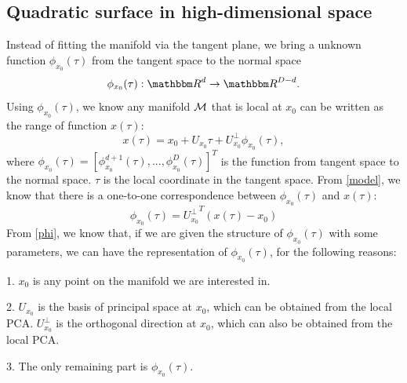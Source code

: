\documentclass{article}
\theoremstyle{remark}
\begin{document}
\subsection{Quadratic surface in high-dimensional space }

 Instead of fitting the manifold via the tangent plane, we bring a unknown function $\phi_{x_0}(\tau)$ from the tangent space to the normal space
 \[
 \phi_{x_0}(\tau): {\mathbbm R}^d \rightarrow {\mathbbm R}^{D-d}.
 \] 
 Using  $\phi_{x_0}(\tau)$, we know any manifold $\cal M$ that is local at $x_0$ can be written as the range of  function  $x(\tau)$:
  \begin{equation}\label{model}
  x (\tau)=  x_0 + U_{x_0} \tau+ U_{x_0}^{\perp} \phi_{x_0} (\tau),
  \end{equation}
where $\phi_{x_0}(\tau)=[\phi_{x_0}^{d+1}(\tau),...,\phi_{x_0}^{D}(\tau)]^T$  is the function from tangent space to the normal space. $\tau$ is the local coordinate in the tangent space.
From \eqref{model}, we know that there is a one-to-one correspondence between $\phi_{x_0} (\tau)$ and $x(\tau)$: %
\begin{equation}\label{phi}
\phi_{x_0}(\tau) = {U_{x_0}^{\perp}}^{T}(x(\tau)-x_0)
\end{equation}
From \eqref{phi}, we know that, if we are given the structure of $\phi_{x_0}(\tau)$ with some parameters, we can have the representation of $\phi_{x_0}(\tau)$, for the following reasons:

1. $x_0$ is any point on the manifold we are interested in.

2.  $U_{x_0}$ is the basis of principal space at $x_0$, which can be obtained from the local PCA. $U_{x_0}^{\perp}$ is the orthogonal direction at $x_0$, which can also be obtained from the local PCA.

3. The only remaining part is  $\phi_{x_0} (\tau)$.
\end{document}
